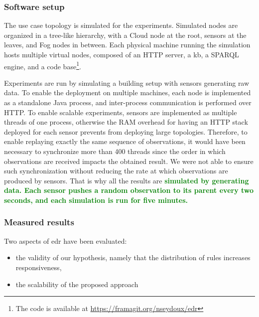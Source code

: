 \documentclass{iosart2c}
\newcommand{\added}[1]{\textcolor{green}{\textbf{#1}}}
\begin{document}
\subsubsection{Software setup}

The use case topology is simulated for the experiments.
Simulated nodes are organized in a tree-like hierarchy, with a Cloud node at the root, sensors at the leaves, and Fog nodes in between.
Each physical machine running the simulation hosts multiple virtual nodes, composed of an HTTP server, a \gls{kb}, a SPARQL engine, and a code base\footnote{The code is available at \url{https://framagit.org/nseydoux/edr}}.

Experiments are run by simulating a building setup with sensors generating raw data. 
To enable the deployment on multiple machines, each node is implemented as a standalone Java process, and inter-process communication is performed over HTTP. 
To enable scalable experiments, sensors are implemented as multiple threads of one process, otherwise the RAM overhead for having an HTTP stack deployed for each sensor prevents from deploying large topologies.
Therefore, to enable replaying exactly the same sequence of observations, it would have been necessary to synchronize more than 400 threads since the order in which observations are received impacts the obtained result. 
We were not able to ensure such synchronization without reducing the rate at which observations are produced by sensors.
That is why all the results are \added{simulated by generating data.
Each sensor pushes a random observation to its parent every two seconds, and each simulation is run for five minutes.}

\subsubsection{Measured results}

Two aspects of \gls{edr} have been evaluated:
\begin{itemize}
	\item the validity of our hypothesis, namely that the distribution of rules increases responsiveness,
	\item the scalability of the proposed approach
\end{itemize} 
\end{document}
